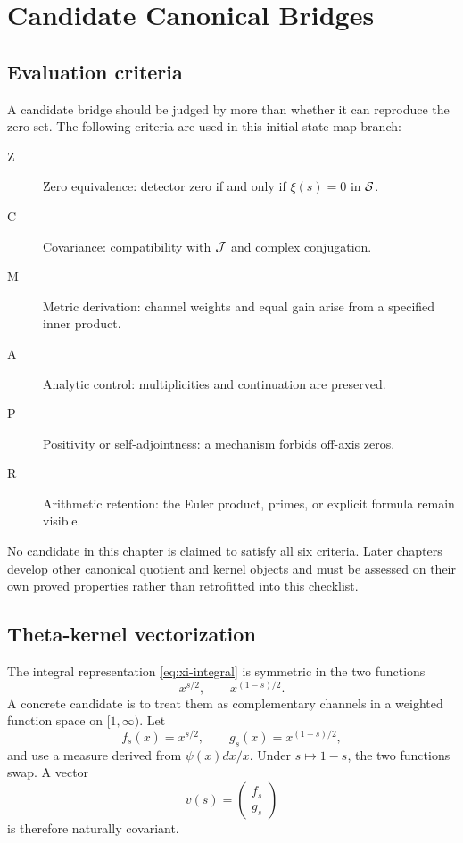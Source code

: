 \chapter{Candidate Canonical Bridges}
\label{chap:candidates}

\section{Evaluation criteria}

A candidate bridge should be judged by more than whether it can reproduce the zero set. The following criteria are used in this initial state-map branch:
\begin{description}
  \item[Z] Zero equivalence: detector zero if and only if $\xi(s)=0$ in $\mathcal{S}$.
  \item[C] Covariance: compatibility with $\mathcal{J}$ and complex conjugation.
  \item[M] Metric derivation: channel weights and equal gain arise from a specified inner product.
  \item[A] Analytic control: multiplicities and continuation are preserved.
  \item[P] Positivity or self-adjointness: a mechanism forbids off-axis zeros.
  \item[R] Arithmetic retention: the Euler product, primes, or explicit formula remain visible.
\end{description}
No candidate in this chapter is claimed to satisfy all six criteria. Later chapters develop other canonical quotient and kernel objects and must be assessed on their own proved properties rather than retrofitted into this checklist.

\section{Theta-kernel vectorization}

The integral representation \cref{eq:xi-integral} is symmetric in the two functions
\[
 x^{s/2},\qquad x^{(1-s)/2}.
\]
A concrete candidate is to treat them as complementary channels in a weighted function space on $[1,\infty)$. Let
\[
 f_s(x)=x^{s/2},\qquad g_s(x)=x^{(1-s)/2},
\]
and use a measure derived from $\psi(x)dx/x$. Under $s\mapsto1-s$, the two functions swap. A vector
\[
 v(s)=\begin{pmatrix}f_s\\g_s\end{pmatrix}
\]
is therefore naturally covariant.

